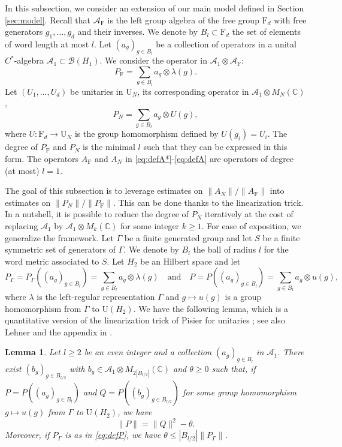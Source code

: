 \documentclass[11pt]{article}
\renewcommand{\star}{{\mathrm{F}}}
\newtheorem{lemma}{Lemma}[section]
\newcommand{\cA}{\mathcal{A}}
\newcommand{\dF}{\mathrm{F}}
\newcommand{\dU}{\mathrm {U}}
\newcommand{\dC}{\mathbb {C}}
\newcommand{\cB}{\mathcal{B}}
\newcommand{\AND}{\quad \mathrm{and} \quad}
\newcommand{\1}{1\!\!{\sf I}}
\begin{document}
In this subsection, we consider an extension of our main model defined in Section \ref{sec:model}. Recall that $\cA_\star$ is the left group algebra of the free group $\dF_d$ with free generators $g_1, \ldots ,g_d$ and their inverses.   We denote by $B_l \subset \dF_d$ the set of elements of word length at most $l$. Let $(a_g)_{g \in B_l}$ be a collection of operators in a unital $C^*$-algebra $\cA_1 \subset \cB(H_1)$. We consider the operator in $ \cA_1 \otimes \cA_\star$:
\begin{equation*}\label{eq:defP*}
P_\star   =\sum_{g \in B_l} a_g \otimes \lambda(g).
\end{equation*}
Let $(U_1,\ldots,U_d)$ be   unitaries in $\dU_N$, its corresponding  operator in $\cA_1 \otimes M_N(\dC)$,
\begin{equation*}
P_N  =   \sum_{g \in B_l }a_g \otimes U(g),
\end{equation*}
where $U : \dF_d \to \dU_N$ is the  group homomorphism defined by $U(g_i) = U_i$. The degree of $P_\star$ and $P_N$ is the minimal $l$ such that they can be expressed in this form. The operators $A_\star$ and $A_N$ in \eqref{eq:defA*}-\eqref{eq:defA} are operators of degree (at most) $l= 1$.

The goal of this subsection is to leverage estimates on $\|A_N\| / \| A_\star \|$  into estimates on $\| P_N \| / \| P_\star\|$.  This can be done thanks to the linearization trick. In a nutshell, it is possible to reduce the degree of $P_N$ iteratively at the cost of replacing $\cA_1$ by $\cA_1 \otimes M_k(\dC)$ for some integer $k \geq 1$. For ease of exposition, we generalize the framework. Let $\Gamma$ be a finite generated group and let $S$ be a finite symmetric set of generators of $\Gamma$. We denote by $B_l$ the ball of radius $l$ for the word metric associated to $S$. Let $H_2$ be an Hilbert space and let 
\begin{equation}\label{eq:defP}
P_\Gamma = P_\Gamma ((a_g)_{g \in B_l} ) = \sum_{g \in B_l} a_g \otimes \lambda(g) \AND  P = P((a_g)_{g \in B_l} ) = \sum_{g \in B_l} a_g \otimes u(g),
\end{equation} where $\lambda$ is the left-regular representation $\Gamma$ and $g \mapsto u(g)$ is a group homomorphism from $\Gamma$ to $\dU(H_2)$. 
We have the following lemma, which is a quantitative version of the linearization trick of Pisier for unitaries \cite[Proposition 6]{MR1401692}; see also Lehner \cite[Section 5]{MR1738412} and the appendix in \cite{BC2}.

\begin{lemma}\label{le:linea}
Let $l\geq 2$ be an even integer and a collection $(a_g)_{g \in B_l}$ in $\cA_1$. There exist $(b_g)_{g \in B_{l/2}}$ with $b_g \in \cA_1 \otimes M_{2 |B_{l/2}|}(\dC)$ and $ \theta \geq 0$ such that, if $P = P((a_g)_{g\in B_l})$ and $Q = P ( (b_g)_{g \in B_{l/2}})$ for some group homomorphism $g \mapsto u(g)$ from $\Gamma$ to $\dU(H_2)$, we have 
$$
 \| P \| = \| Q \|^2 - \theta.
$$
Moreover, if $P_\Gamma$ is as in \eqref{eq:defP}, we have $\theta  \leq |B_{l/2}| \| P_\Gamma \|$.
\end{lemma}
\end{document}
